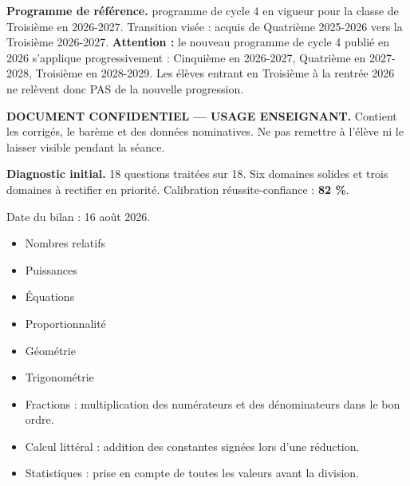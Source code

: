 \documentclass[10pt,a4paper]{article}
\begin{document}
\begin{methodbox}\small\textbf{Programme de référence.} programme de cycle 4 en vigueur pour la classe de Troisième en 2026-2027. Transition visée : acquis de Quatrième 2025-2026 vers la Troisième 2026-2027. \textbf{Attention :} le nouveau programme de cycle 4 publié en 2026 s'applique progressivement : Cinquième en 2026-2027, Quatrième en 2027-2028, Troisième en 2028-2029. Les élèves entrant en Troisième à la rentrée 2026 ne relèvent donc PAS de la nouvelle progression.\end{methodbox}
\begin{keybox}\textbf{DOCUMENT CONFIDENTIEL --- USAGE ENSEIGNANT.} Contient les corrigés, le barème et des données nominatives. Ne pas remettre à l'élève ni le laisser visible pendant la séance.\end{keybox}
\begin{methodbox}
\textbf{Diagnostic initial.} 18 questions traitées sur 18. Six domaines solides et trois domaines à rectifier en priorité. Calibration réussite-confiance : \textbf{82 \%}.
\par Date du bilan : 16 août 2026.
\end{methodbox}
\begin{itemize}\item Nombres relatifs\item Puissances\item Équations\item Proportionnalité\item Géométrie\item Trigonométrie\end{itemize}
\begin{itemize}\item Fractions : multiplication des numérateurs et des dénominateurs dans le bon ordre.\item Calcul littéral : addition des constantes signées lors d'une réduction.\item Statistiques : prise en compte de toutes les valeurs avant la division.\end{itemize}
\end{document}
